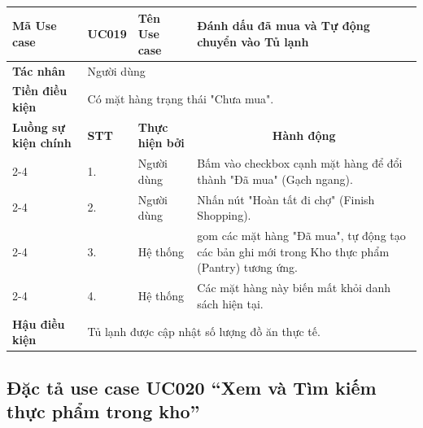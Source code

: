 \documentclass[../main.tex]{subfiles}
\begin{document}
\begin{longtable}{|p{2.7cm}|p{0.8cm}|p{2.6cm}|p{7.3cm}|}
\hline
\cellcolor[HTML]{D5F5E3}\textbf{Mã Use case} & \multicolumn{1}{l|}{UC019} & \cellcolor[HTML]{D5F5E3}\textbf{Tên Use case} & Đánh dấu đã mua và Tự động chuyển vào Tủ lạnh \\ \hline
\cellcolor[HTML]{D5F5E3}\textbf{Tác nhân} & \multicolumn{3}{p{10.7cm}|}{Người dùng} \\ \hline
\cellcolor[HTML]{D5F5E3}\textbf{Tiền điều kiện} & \multicolumn{3}{p{10.7cm}|}{Có mặt hàng trạng thái "Chưa mua".} \\ \hline

\cellcolor[HTML]{D5F5E3}\textbf{Luồng sự kiện chính} & \cellcolor[HTML]{FDEBD0}\textbf{STT} & \cellcolor[HTML]{FDEBD0}\textbf{Thực hiện bởi} & \multicolumn{1}{c|}{\cellcolor[HTML]{FDEBD0}\textbf{Hành động}} \\ \cline{2-4} 
\cellcolor[HTML]{D5F5E3} & 1. & Người dùng & Bấm vào checkbox cạnh mặt hàng để đổi thành "Đã mua" (Gạch ngang). \\ \cline{2-4} 
\cellcolor[HTML]{D5F5E3} & 2. & Người dùng & Nhấn nút "Hoàn tất đi chợ" (Finish Shopping). \\ \cline{2-4} 
\cellcolor[HTML]{D5F5E3} & 3. & Hệ thống & gom các mặt hàng "Đã mua", tự động tạo các bản ghi mới trong Kho thực phẩm (Pantry) tương ứng. \\ \cline{2-4} 
\cellcolor[HTML]{D5F5E3} & 4. & Hệ thống & Các mặt hàng này biến mất khỏi danh sách hiện tại. \\ \hline

\cellcolor[HTML]{D5F5E3}\textbf{Hậu điều kiện} & \multicolumn{3}{p{10.7cm}|}{Tủ lạnh được cập nhật số lượng đồ ăn thực tế.} \\ \hline
\end{longtable}
\endgroup

\subsection{Đặc tả use case UC020 ``Xem và Tìm kiếm thực phẩm trong kho''}
\vspace{0.5cm}

\begingroup
\renewcommand{\arraystretch}{1.5}
\end{document}
